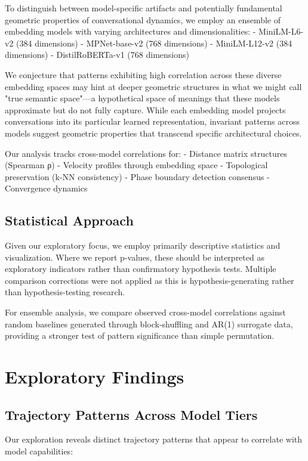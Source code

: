 \documentclass[11pt,letterpaper]{article}
\newcommand{\miniLMDim}{384}
\newcommand{\mpnetDim}{768}
\newcommand{\distilBertDim}{768}
\begin{document}
To distinguish between model-specific artifacts and potentially fundamental geometric properties of conversational dynamics, we employ an ensemble of embedding models with varying architectures and dimensionalities:
- MiniLM-L6-v2 (\miniLMDim{} dimensions)
- MPNet-base-v2 (\mpnetDim{} dimensions)  
- MiniLM-L12-v2 (\miniLMDim{} dimensions)
- DistilRoBERTa-v1 (\distilBertDim{} dimensions)

We conjecture that patterns exhibiting high correlation across these diverse embedding spaces may hint at deeper geometric structures in what we might call "true semantic space"—a hypothetical space of meanings that these models approximate but do not fully capture. While each embedding model projects conversations into its particular learned representation, invariant patterns across models suggest geometric properties that transcend specific architectural choices.

Our analysis tracks cross-model correlations for:
- Distance matrix structures (Spearman ρ)
- Velocity profiles through embedding space
- Topological preservation (k-NN consistency)
- Phase boundary detection consensus
- Convergence dynamics

\subsection{Statistical Approach}

Given our exploratory focus, we employ primarily descriptive statistics and visualization. Where we report p-values, these should be interpreted as exploratory indicators rather than confirmatory hypothesis tests. Multiple comparison corrections were not applied as this is hypothesis-generating rather than hypothesis-testing research.

For ensemble analysis, we compare observed cross-model correlations against random baselines generated through block-shuffling and AR(1) surrogate data, providing a stronger test of pattern significance than simple permutation.

\section{Exploratory Findings}

\subsection{Trajectory Patterns Across Model Tiers}

Our exploration reveals distinct trajectory patterns that appear to correlate with model capabilities:
\end{document}
